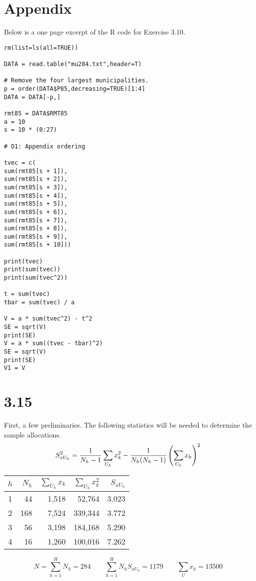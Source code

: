 \documentclass[12pt]{article}
\begin{document}

\section*{Appendix}

Below is a one page excerpt of the R code for Exercise 3.10.

\begin{verbatim}
rm(list=ls(all=TRUE))

DATA = read.table("mu284.txt",header=T)

# Remove the four largest municipalities.
p = order(DATA$P85,decreasing=TRUE)[1:4]
DATA = DATA[-p,]

rmt85 = DATA$RMT85
a = 10
s = 10 * (0:27)

# O1: Appendix ordering

tvec = c(
sum(rmt85[s + 1]),
sum(rmt85[s + 2]),
sum(rmt85[s + 3]),
sum(rmt85[s + 4]),
sum(rmt85[s + 5]),
sum(rmt85[s + 6]),
sum(rmt85[s + 7]),
sum(rmt85[s + 8]),
sum(rmt85[s + 9]),
sum(rmt85[s + 10]))

print(tvec)
print(sum(tvec))
print(sum(tvec^2))

t = sum(tvec)
tbar = sum(tvec) / a

V = a * sum(tvec^2) - t^2
SE = sqrt(V)
print(SE)
V = a * sum((tvec - tbar)^2)
SE = sqrt(V)
print(SE)
V1 = V
\end{verbatim}


\section*{3.15}
First, a few preliminaries.
The following statistics will be needed to determine the sample allocations.
\[
S_{xU_h}^2={1\over N_h-1}\sum_{U_h}x_k^2-{1\over N_h(N_h-1)}
\left(\sum_{U_h}x_k\right)^2
\]

\begin{center}
\begin{tabular}{|c|r|r|r|r|}
\hline
$h$ & $N_h$ & $\sum_{U_h}x_k$ & $\sum_{U_h}x_k^2$ & $S_{xU_h}$\\
\hline
1 & 44 & 1,518 & 52,764 & 3.023\\
2 & 168 & 7,524 & 339,344 & 3.772\\
3 & 56 & 3,198 & 184,168 & 5.290\\
4 & 16 & 1,260 & 100,016 & 7.262\\
\hline
\end{tabular}
\end{center}

\[
N=\sum_{h=1}^HN_h=284\qquad
\sum_{h=1}^HN_hS_{xU_h}=1179\qquad
\sum_Ux_k=13500
\]
\end{document}
